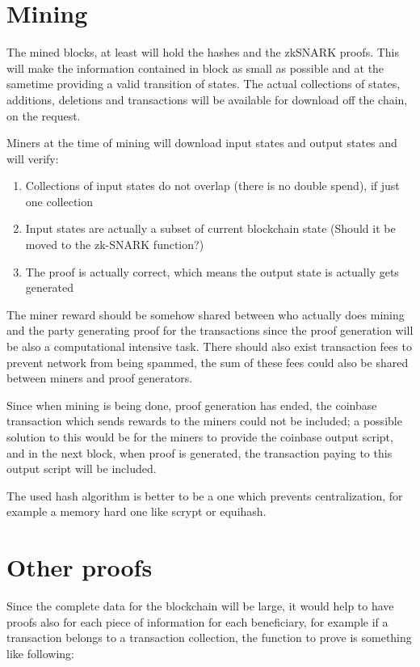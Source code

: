\documentclass{article}
\begin{document}
\section{Mining}

The mined blocks, at least will hold the hashes and the zkSNARK proofs. This will make the information contained in block as small as possible and at the sametime providing a valid transition of states. The actual collections of states, additions, deletions and transactions will be available for download off the chain, on the request.

Miners at the time of mining will download input states and output states and will verify:

\begin{enumerate}
\item Collections of input states do not overlap (there is no double spend), if just one collection 
\item Input states are actually a subset of current blockchain state (Should it be moved to the zk-SNARK function?)
\item The proof is actually correct, which means the output state is actually gets generated
\end{enumerate}

The miner reward should be somehow shared between who actually does mining and the party generating proof for the transactions since the proof generation will be also a computational intensive task.
There should also exist transaction fees to prevent network from being spammed, the sum of these fees could also be shared between miners and proof generators.

Since when mining is being done, proof generation has ended, the coinbase transaction which sends rewards to the miners could not be included; a possible solution to this would be for the miners to provide the coinbase output script, and in the next block, when proof is generated, the transaction paying to this output script will be included.

The used hash algorithm is better to be a one which prevents centralization, for example a memory hard one like scrypt or equihash.

\section{Other proofs}

Since the complete data for the blockchain will be large, it would help to have proofs also for each piece of information for each beneficiary, for example if a transaction belongs to a transaction collection, the function to prove is something like following:
\end{document}
